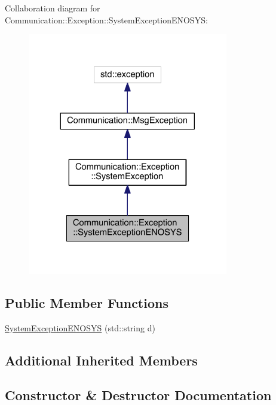 Collaboration diagram for Communication\+:\+:Exception\+:\+:System\+Exception\+E\+N\+O\+S\+Y\+S\+:\nopagebreak
\begin{figure}[H]
\begin{center}
\leavevmode
\includegraphics[width=248pt]{class_communication_1_1_exception_1_1_system_exception_e_n_o_s_y_s__coll__graph}
\end{center}
\end{figure}
\subsection*{Public Member Functions}
\begin{DoxyCompactItemize}
\item 
\hyperlink{class_communication_1_1_exception_1_1_system_exception_e_n_o_s_y_s_a5c63273822ea2495a13f13e2c533c03b}{System\+Exception\+E\+N\+O\+S\+Y\+S} (std\+::string d)
\end{DoxyCompactItemize}
\subsection*{Additional Inherited Members}


\subsection{Constructor \& Destructor Documentation}
\hypertarget{class_communication_1_1_exception_1_1_system_exception_e_n_o_s_y_s_a5c63273822ea2495a13f13e2c533c03b}{}
